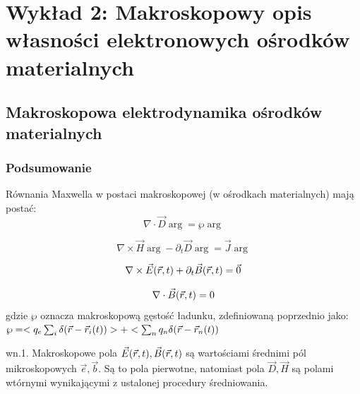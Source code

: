\section{Wykład 2: Makroskopowy opis własności elektronowych ośrodków materialnych}
\subsection{Makroskopowa elektrodynamika ośrodków materialnych}
\subsubsection{Podsumowanie}
Równania Maxwella w postaci makroskopowej (w ośrodkach materialnych) mają postać:
\begin{equation} \nabla \cdot \vec{D}\arg=\wp\arg \label{r1}
 \end{equation}
 
\begin{equation} \nabla \times \vec{H}\arg-\partial_t\vec{D}\arg=\vec{J}\arg \label{r2}
\end{equation}

\begin{equation} \nabla \times \vec{E}(\vec{r},t)+\partial_t \vec{B}(\vec{r},t)=\vec{0} \label{r3}\end{equation} 

\begin{equation} \nabla \cdot \vec{B}(\vec{r},t)=0 \end{equation}
gdzie $\wp$ oznacza makroskopową gęstość ładunku, zdefiniowaną poprzednio jako: $\wp=<q_e\sum_i\delta(\vec{r}-\vec{r}_i(t))>+<\sum_nq_n\delta(\vec{r}-\vec{r}_n(t))$

wn.1. Makroskopowe pola $\vec{E}(\vec{r},t),\vec{B}(\vec{r},t)$ są wartościami średnimi pól mikroskopowych $\vec{e},\vec{b}$. Są to pola pierwotne, natomiast pola $\vec{D},\vec{H}$ są polami wtórnymi wynikającymi z ustalonej procedury średniowania.

